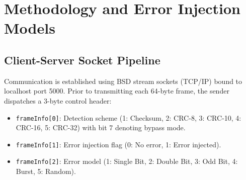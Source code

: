 \documentclass[11pt,a4paper]{article}
\begin{document}
\section{Methodology and Error Injection Models}

\subsection{Client-Server Socket Pipeline}

Communication is established using BSD stream sockets (TCP/IP) bound to localhost port 5000. Prior to transmitting each 64-byte frame, the sender dispatches a 3-byte control header:
\begin{itemize}
    \item \texttt{frameInfo[0]}: Detection scheme (1: Checksum, 2: CRC-8, 3: CRC-10, 4: CRC-16, 5: CRC-32) with bit 7 denoting bypass mode.
    \item \texttt{frameInfo[1]}: Error injection flag (0: No error, 1: Error injected).
    \item \texttt{frameInfo[2]}: Error model (1: Single Bit, 2: Double Bit, 3: Odd Bit, 4: Burst, 5: Random).
\end{itemize}
\end{document}
